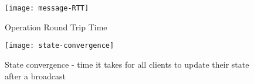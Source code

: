 \begin{figure}
    \centering
    \texttt{[image: message-RTT]}
    \caption{Operation Round Trip Time}
    \label{fig:message-RTT}
\end{figure}


\begin{figure}
    \centering
    \texttt{[image: state-convergence]}
    \caption{State convergence - time it takes for all clients to update their state after a broadcast}
    \label{fig:state-convergence}
\end{figure}



